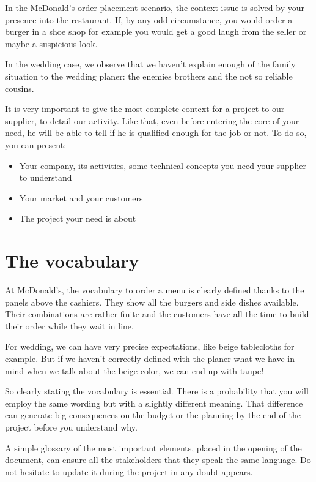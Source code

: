 In the McDonald’s order placement scenario, the context issue is solved by your presence into the restaurant. If, by any odd circumstance, you would order a burger in a shoe shop for example you would get a good laugh from the seller or maybe a suspicious look.

In the wedding case, we observe that we haven’t explain enough of the family situation to the wedding planer: the enemies brothers and the not so reliable cousins.

It is very important to give the most complete context for a project to our supplier, to detail our activity. Like that, even before entering the core of your need, he will be able to tell if he is qualified enough for the job or not. To do so, you can present:

\begin{itemize}
	\item Your company, its activities, some technical concepts you need your supplier to understand
	\item Your market and your customers
	\item The project your need is about
\end{itemize}


\section{The vocabulary}
At McDonald’s, the vocabulary to order a menu is clearly defined thanks to the panels above the cashiers. They show all the burgers and side dishes available. Their combinations are rather finite and the customers have all the time to build their order while they wait in line.

For wedding, we can have very precise expectations, like beige tablecloths for example. But if we haven’t correctly defined with the planer what we have in mind when we talk about the beige color, we can end up with taupe!

So clearly stating the vocabulary is essential. There is a probability that you will employ the same wording but with a slightly different meaning. That difference can generate big consequences on the budget or the planning by the end of the project before you understand why.

A simple glossary of the most important elements, placed in the opening of the document, can ensure all the stakeholders that they speak the same language. Do not hesitate to update it during the project in any doubt appears.


